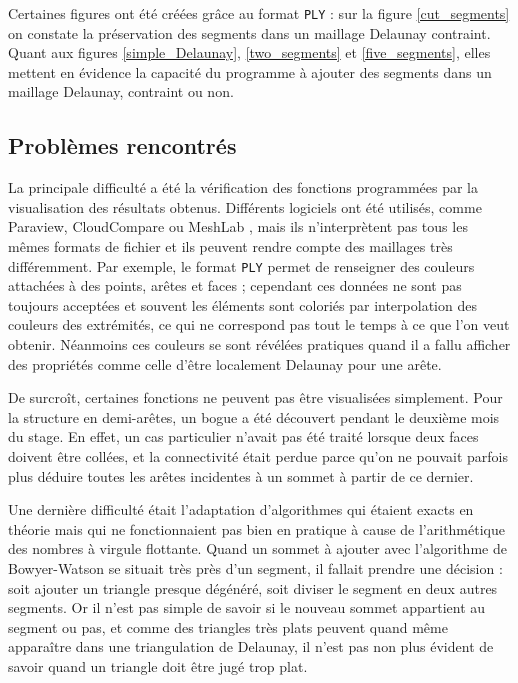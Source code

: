 \documentclass[12pt,a4paper]{report}
\begin{document}
Certaines figures ont été créées grâce au format \verb+PLY+ : sur la figure \ref{cut_segments} on constate la préservation des segments dans un maillage Delaunay contraint. Quant aux figures \ref{simple_Delaunay}, \ref{two_segments} et \ref{five_segments}, elles mettent en évidence la capacité du programme à ajouter des segments dans un maillage Delaunay, contraint ou non.

\subsection{Problèmes rencontrés}

La principale difficulté a été la vérification des fonctions programmées par la visualisation des résultats obtenus. Différents logiciels ont été utilisés, comme Paraview, CloudCompare ou MeshLab \cite{Paraview, CloudCompare, MeshLab}, mais ils n'interprètent pas tous les mêmes formats de fichier et ils peuvent rendre compte des maillages très différemment. Par exemple, le format \verb+PLY+ permet de renseigner des couleurs attachées à des points, arêtes et faces ; cependant ces données ne sont pas toujours acceptées et souvent les éléments sont coloriés par interpolation des couleurs des extrémités, ce qui ne correspond pas tout le temps à ce que l'on veut obtenir. Néanmoins ces couleurs se sont révélées pratiques quand il a fallu afficher des propriétés comme celle d'être localement Delaunay pour une arête.

De surcroît, certaines fonctions ne peuvent pas être visualisées simplement. Pour la structure en demi-arêtes, un bogue a été découvert pendant le deuxième mois du stage. En effet, un cas particulier n'avait pas été traité lorsque deux faces doivent être collées, et la connectivité était perdue parce qu'on ne pouvait parfois plus déduire toutes les arêtes incidentes à un sommet à partir de ce dernier.

Une dernière difficulté était l'adaptation d'algorithmes qui étaient exacts en théorie mais qui ne fonctionnaient pas bien en pratique à cause de l'arithmétique des nombres à virgule flottante. Quand un sommet à ajouter avec l'algorithme de Bowyer-Watson se situait très près d'un segment, il fallait prendre une décision : soit ajouter un triangle presque dégénéré, soit diviser le segment en deux autres segments. Or il n'est pas simple de savoir si le nouveau sommet appartient au segment ou pas, et comme des triangles très plats peuvent quand même apparaître dans une triangulation de Delaunay, il n'est pas non plus évident de savoir quand un triangle doit être jugé \og trop plat\fg{}.
\end{document}
